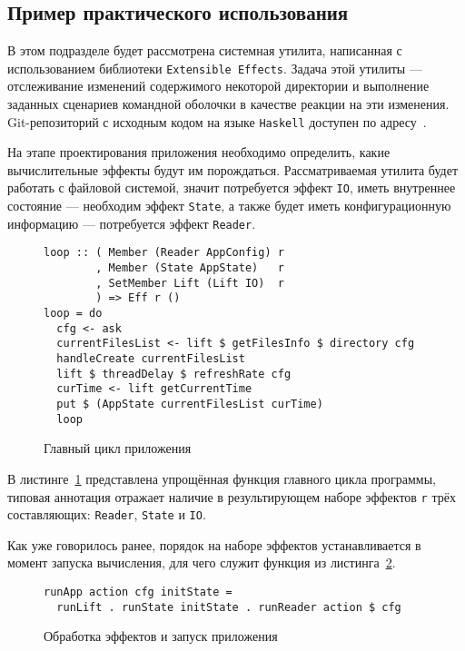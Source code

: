 \subsection{Пример практического использования}

В этом подразделе будет рассмотрена системная утилита,
написанная с использованием библиотеки \lstinline{Extensible Effects}. 
Задача этой утилиты --- отслеживание изменений содержимого некоторой директории
и выполнение заданных сценариев командной оболочки в качестве реакции на эти 
изменения. Git-репозиторий с исходным кодом на языке \lstinline{Haskell} 
доступен по адресу~\cite{fileTrigger}.

На этапе проектирования приложения необходимо определить, какие вычислительные
эффекты будут им порождаться. Рассматриваемая утилита будет работать с файловой
системой, значит потребуется эффект \lstinline{IO}, иметь внутреннее 
состояние --- необходим эффект \lstinline{State}, а также будет иметь 
конфигурационную информацию --- потребуется эффект \lstinline{Reader}.

\begin{figure}[t]
\begin{lstlisting}
loop :: ( Member (Reader AppConfig) r
        , Member (State AppState)   r
        , SetMember Lift (Lift IO)  r
        ) => Eff r ()
loop = do
  cfg <- ask
  currentFilesList <- lift $ getFilesInfo $ directory cfg
  handleCreate currentFilesList
  lift $ threadDelay $ refreshRate cfg
  curTime <- lift getCurrentTime
  put $ (AppState currentFilesList curTime)
  loop
\end{lstlisting}
\caption{Главный цикл приложения}
\label{listing:ftMainLoop}
\end{figure}

В листинге~\ref{listing:ftMainLoop} представлена упрощённая функция главного 
цикла программы, типовая аннотация отражает наличие в результирующем наборе 
эффектов \lstinline{r} трёх составляющих: \lstinline{Reader}, \lstinline{State} 
и \lstinline{IO}.

Как уже говорилось ранее, порядок на наборе эффектов устанавливается в момент 
запуска вычисления, для чего служит функция из листинга~\ref{listing:ftRun}.

\begin{figure}[t]
\begin{lstlisting}
runApp action cfg initState =
  runLift . runState initState . runReader action $ cfg
\end{lstlisting}
\caption{Обработка эффектов и запуск приложения}
\label{listing:ftRun}
\end{figure}

